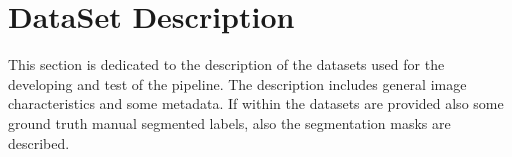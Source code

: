 \documentclass{standalone}
\begin{document}
	\section{DataSet Description}
	
	This section is dedicated to the description of the datasets used for the developing and test of the pipeline. The description includes general image characteristics and some metadata. If within the datasets are provided also some ground truth manual segmented labels, also the segmentation masks are described. 
\end{document}
